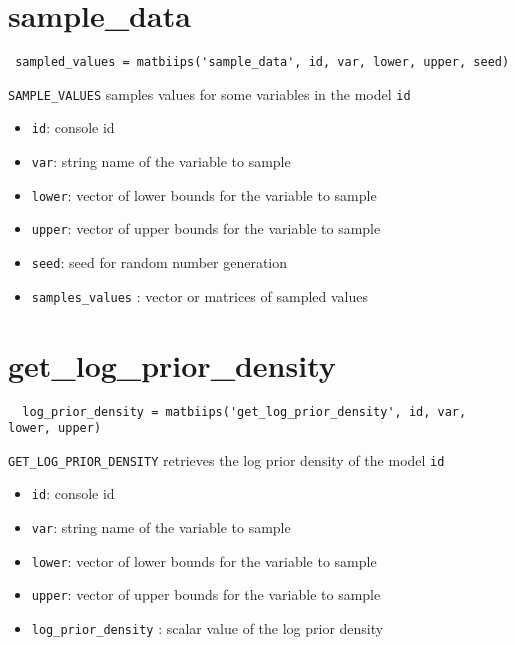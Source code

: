 \documentclass[11pt,twoside]{article}
\begin{document}
\section{sample\_data}

 \begin{lstlisting}
 sampled_values = matbiips('sample_data', id, var, lower, upper, seed)
 \end{lstlisting}

  \texttt{SAMPLE\_VALUES} samples values for some variables in the model \texttt{id}

  \begin{itemize}
   \item \texttt{id}: console id
   \item \texttt{var}: string name of the variable to sample
   \item \texttt{lower}: vector of lower bounds for the variable to sample
   \item \texttt{upper}: vector of upper bounds for the variable to sample
   \item \texttt{seed}: seed for random number generation
   \item \texttt{samples\_values} : vector or matrices of sampled values
   \end{itemize}

   \section{get\_log\_prior\_density}

 \begin{lstlisting}
  log_prior_density = matbiips('get_log_prior_density', id, var, lower, upper)
 \end{lstlisting}
    \texttt{GET\_LOG\_PRIOR\_DENSITY} retrieves the log prior density of the model \texttt{id}

 \begin{itemize}
   \item \texttt{id}: console id
   \item \texttt{var}: string name of the variable to sample
   \item \texttt{lower}: vector of lower bounds for the variable to sample
   \item \texttt{upper}: vector of upper bounds for the variable to sample
   \item \texttt{log\_prior\_density} : scalar value of the log prior density
   \end{itemize}
\end{document}
